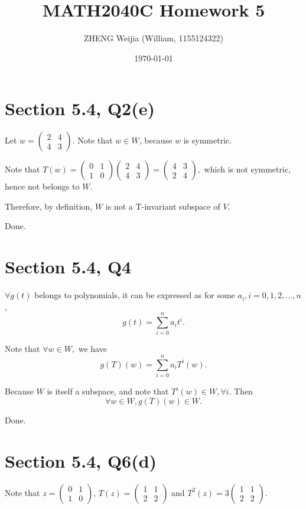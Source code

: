 \documentclass[12pt]{article}%
\begin{document}
\title{MATH2040C Homework 5}
\author{ZHENG Weijia (William, 1155124322)}
\date{\today}
\maketitle



\section{Section 5.4, Q2(e)}

Let $w=\begin{pmatrix}2&4\\4&3\end{pmatrix}.$ Note that $w \in W$, because $w$ is symmetric.

Note that $T(w)=\begin{pmatrix}0&1\\1&0\end{pmatrix}\begin{pmatrix}2&4\\4&3\end{pmatrix}=\begin{pmatrix}4&3\\2&4\end{pmatrix},$ which is not symmetric, hence not belongs to $W$.

Therefore, by definition, $W$ is not a T-invariant subspace of $V.$

Done.


\section{Section 5.4, Q4}

$\forall g(t)$ belongs to polynomials, it can be expressed as for some $a_i,i=0,1,2,...,n$, $$g(t)=\sum_{i=0}^{n}a_i t^{i}.$$

Note that $\forall w \in W,$ we have $$g(T)(w)=\sum_{i=0}^{n}a_i T^{i}(w).$$

Because $W$ is itself a subspace, and note that $T^{i}(w) \in W, \forall i.$ Then $$\forall w \in W, g(T)(w)\in W.$$

Done.

\section{Section 5.4, Q6(d)}

Note that $z=\begin{pmatrix} 0&1\\1&0 \end{pmatrix}$, $T(z)=\begin{pmatrix} 1&1\\2&2\end{pmatrix}$ and $T^2(z)=3 \begin{pmatrix} 1&1\\2&2\end{pmatrix}.$
\end{document}
